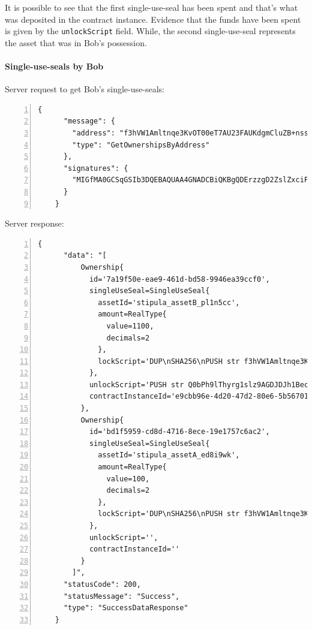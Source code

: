 It is possible to see that the first single-use-seal has been spent and that's what was deposited in the 
contract instance. Evidence that the funds have been spent is given by the \verb|unlockScript| field. 
While, the second single-use-seal represents the asset that was in Bob's possession.

\paragraph{Single-use-seals by Bob}

Server request to get Bob's single-use-seals:
{
  \small
  \begin{Verbatim}[numbers=left,xleftmargin=1cm,firstnumber=1,breaklines=true,breakanywhere=true,tabsize=2]
    {
      "message": {
        "address": "f3hVW1Amltnqe3KvOT00eT7AU23FAUKdgmCluZB+nss=",
        "type": "GetOwnershipsByAddress"
      },
      "signatures": {
        "MIGfMA0GCSqGSIb3DQEBAQUAA4GNADCBiQKBgQDErzzgD2ZslZxciFAiX3/ot7lrkZDw4148jFZrsDZPE6CVs9xXFSHGgy/mFvIFLXhnChO6Nyd2be3lbgeavLMCMVUiTStXr117Km17keWpb3sItkKKsLFBOcIIU8XXowI/OhzQN2XPZYESHgjdQ5vwEj2YyueiS7WKP94YWz/pswIDAQAB": "hSNodnUyusffNlv+KNq4605pFvqh91pVspFhTgbmWccE/LKM6h4bedpvTgMHoVDezvA7v2XTzmLG5eL3lOeA6I2xJMH32DcV60IPSoh61oVHnwPQcQHY039D4y5VSJ0GMQJKIcTEq3fqIdabg7261xUaegHUnXrcyynh9GpMJxk="
      }
    }
  \end{Verbatim}
}

Server response:
{
  \small
  \begin{Verbatim}[numbers=left,xleftmargin=1cm,firstnumber=1,breaklines=true,breakanywhere=true,tabsize=2]
    {
      "data": "[
          Ownership{
            id='7a19f50e-eae9-461d-bd58-9946ea39ccf0', 
            singleUseSeal=SingleUseSeal{
              assetId='stipula_assetB_pl1n5cc', 
              amount=RealType{
                value=1100, 
                decimals=2
              }, 
              lockScript='DUP\nSHA256\nPUSH str f3hVW1Amltnqe3KvOT00eT7AU23FAUKdgmCluZB+nss=\nEQUAL\nCHECKSIG\nHALT\n'
            }, 
            unlockScript='PUSH str Q0bPh9lThyrg1slz9AGDJDJh1BecN9SlGCeVe3BqLod+zO7q0wvIy8tLognHNBkR8e8zKo6nWGQ8qZ7egjOmm5BQsqZzt8xL3gBbR36vgk9J3G9ObiTR2Dd7hMqsqyJnLT3aZUPXGc6RZoM/iUFGJUXhq2T6DStvYNKuAH+Lfow=\nPUSH str MIGfMA0GCSqGSIb3DQEBAQUAA4GNADCBiQKBgQDErzzgD2ZslZxciFAiX3/ot7lrkZDw4148jFZrsDZPE6CVs9xXFSHGgy/mFvIFLXhnChO6Nyd2be3lbgeavLMCMVUiTStXr117Km17keWpb3sItkKKsLFBOcIIU8XXowI/OhzQN2XPZYESHgjdQ5vwEj2YyueiS7WKP94YWz/pswIDAQAB\n', 
            contractInstanceId='e9cbb96e-4d20-47d2-80e6-5b56701800b1'
          }, 
          Ownership{
            id='bd1f5959-cd8d-4716-8ece-19e1757c6ac2', 
            singleUseSeal=SingleUseSeal{
              assetId='stipula_assetA_ed8i9wk', 
              amount=RealType{
                value=100, 
                decimals=2
              }, 
              lockScript='DUP\nSHA256\nPUSH str f3hVW1Amltnqe3KvOT00eT7AU23FAUKdgmCluZB+nss=\nEQUAL\nCHECKSIG\nHALT\n'
            }, 
            unlockScript='', 
            contractInstanceId=''
          }
        ]",
      "statusCode": 200,
      "statusMessage": "Success",
      "type": "SuccessDataResponse"
    }
  \end{Verbatim}
}

